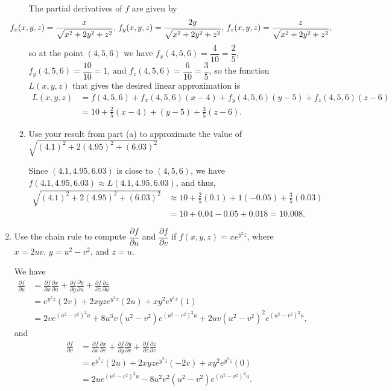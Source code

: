 \documentclass[12pt]{article}
\newcommand{\points}[1]{\marginpar{\hspace{24pt}[#1]}}
\newcommand{\di}{\displaystyle}
\begin{document}
\begin{enumerate}
\begin{enumerate}
The partial derivatives of $f$ are given by
\[
\hspace{-24pt} f_x(x,y,z) = \frac{x}{\sqrt{x^2+2y^2+z^2}}, \, f_y(x,y,z) = \frac{2y}{\sqrt{x^2+2y^2+z^2}}, \,f_z(x,y,z) = \frac{z}{\sqrt{x^2+2y^2+z^2}},
\]
so at the point $(4,5,6)$ we have $f_x(4,5,6) = \dfrac{4}{10}=\dfrac{2}{5}$, $f_y(4,5,6) = \dfrac{10}{10} = 1$, and $f_z(4,5,6) = \dfrac{6}{10} = \dfrac{3}{5}$, so the function $L(x,y,z)$ that gives the desired linear approximation is
\begin{align*}
L(x,y,z) &= f(4,5,6) + f_x(4,5,6)(x-4)+f_y(4,5,6)(y-5)+f_z(4,5,6)(z-6)\\
 & = 10+\frac{2}{5}(x-4)+(y-5)+\frac{3}{5}(z-6).
\end{align*}

\bigskip


\item Use your result from part (a) to approximate the value of $\sqrt{(4.1)^2+2(4.95)^2+(6.03)^2}$ \points{2}

\bigskip

Since $(4.1, 4.95, 6.03)$ is close to $(4,5,6)$, we have $f(4.1, 4.95, 6.03)\approx L(4.1, 4.95, 6.03)$, and thus,
\begin{align*}
\sqrt{(4.1)^2+2(4.95)^2+(6.03)^2} &\approx 10 + \frac{2}{5}(0.1)+1(-0.05)+\frac{3}{5}(0.03)\\
 &= 10+0.04-0.05+0.018 = 10.008.
\end{align*}

\bigskip


\end{enumerate} 



\item Use the chain rule to compute $\dfrac{\partial f}{\partial u}$ and $\dfrac{\partial f}{\partial v}$ if $\di f(x,y,z) = xe^{y^2z}$, where $x = 2uv$, $y=u^2-v^2$, and $z=u$. \points{5}

\bigskip

We have
\begin{align*}
\frac{\partial f}{\partial u} & = \frac{\partial f}{\partial x}\frac{\partial x}{\partial u} + \frac{\partial f}{\partial y}\frac{\partial y}{\partial u} + \frac{\partial f}{\partial z}\frac{\partial z}{\partial u}\\
& = e^{y^2z}(2v)+2xyze^{y^2z}(2u)+xy^2e^{y^2z}(1)\\
& = 2ve^{(u^2-v^2)^2u}+8u^3v(u^2-v^2)e^{(u^2-v^2)^2u}+2uv(u^2-v^2)^2e^{(u^2-v^2)^2u},
\end{align*}
and
\begin{align*}
\frac{\partial f}{\partial v} & = \frac{\partial f}{\partial x}\frac{\partial x}{\partial v} + \frac{\partial f}{\partial y}\frac{\partial y}{\partial v} + \frac{\partial f}{\partial z}\frac{\partial z}{\partial v}\\
& = e^{y^2z}(2u)+2xyze^{y^2z}(-2v)+xy^2e^{y^2z}(0)\\
& = 2ue^{(u^2-v^2)^2u}-8u^2v^2(u^2-v^2)e^{(u^2-v^2)^2u}.
\end{align*}

\end{enumerate}
\end{document}
